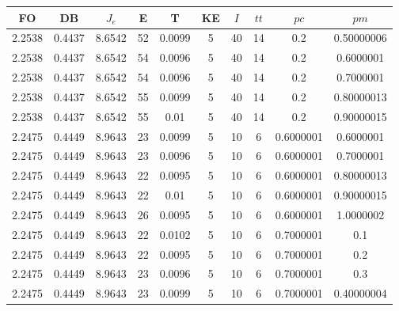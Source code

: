 \begin{table}[h!]
    \footnotesize
    \begin{center}
        \begin{tabular}{|c|c|c|c|c|c|c|c|c|c|}
        \hline
            {\bf FO} & {\bf DB} & $J_e$ & {\bf E} & {\bf T} & {\bf KE} & $I$ & $tt$ & $pc$ & $pm$ \\
        \hline
        \hline
            2.2538 & 0.4437  & 8.6542 & 52 & 0.0099 & 5 & 40 & 14 & 0.2 & 0.50000006\\
        \hline
        \hline
            2.2538 & 0.4437  & 8.6542 & 54 & 0.0096 & 5 & 40 & 14 & 0.2 & 0.6000001\\
        \hline
        \hline
            2.2538 & 0.4437  & 8.6542 & 54 & 0.0096 & 5 & 40 & 14 & 0.2 & 0.7000001\\
        \hline
        \hline
            2.2538 & 0.4437  & 8.6542 & 55 & 0.0099 & 5 & 40 & 14 & 0.2 & 0.80000013\\
        \hline
        \hline
            2.2538 & 0.4437  & 8.6542 & 55 & 0.01 & 5 & 40 & 14 & 0.2 & 0.90000015\\
        \hline
        \hline
            2.2475 & 0.4449  & 8.9643 & 23 & 0.0099 & 5 & 10 & 6 & 0.6000001 & 0.6000001\\
        \hline
        \hline
            2.2475 & 0.4449  & 8.9643 & 23 & 0.0096 & 5 & 10 & 6 & 0.6000001 & 0.7000001\\
        \hline
        \hline
            2.2475 & 0.4449  & 8.9643 & 22 & 0.0095 & 5 & 10 & 6 & 0.6000001 & 0.80000013\\
        \hline
        \hline
            2.2475 & 0.4449  & 8.9643 & 22 & 0.01 & 5 & 10 & 6 & 0.6000001 & 0.90000015\\
        \hline
        \hline
            2.2475 & 0.4449  & 8.9643 & 26 & 0.0095 & 5 & 10 & 6 & 0.6000001 & 1.0000002\\
        \hline
        \hline
            2.2475 & 0.4449  & 8.9643 & 22 & 0.0102 & 5 & 10 & 6 & 0.7000001 & 0.1\\
        \hline
        \hline
            2.2475 & 0.4449  & 8.9643 & 22 & 0.0095 & 5 & 10 & 6 & 0.7000001 & 0.2\\
        \hline
        \hline
            2.2475 & 0.4449  & 8.9643 & 23 & 0.0096 & 5 & 10 & 6 & 0.7000001 & 0.3\\
        \hline
        \hline
            2.2475 & 0.4449  & 8.9643 & 23 & 0.0099 & 5 & 10 & 6 & 0.7000001 & 0.40000004\\
        \hline

\end{tabular}
\end{center}
\end{table}
